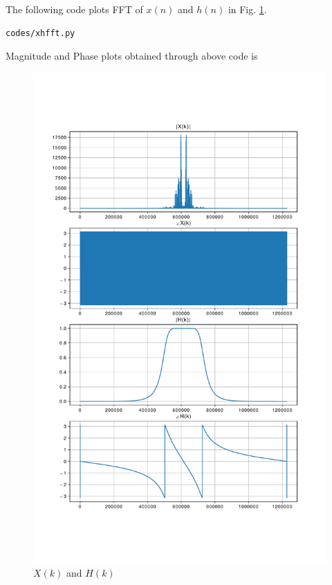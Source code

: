 \documentclass[journal,12pt,twocolumn]{IEEEtran}
\renewcommand\thesection{\arabic{section}}
\begin{document}
\begin{enumerate}[label=\thesection.\arabic*
,ref=\thesection.\theenumi]
The following code plots FFT of $x(n)$ and $h(n)$ in Fig. \ref{fig:xhfft}.
\begin{lstlisting}
codes/xhfft.py
\end{lstlisting}
Magnitude and Phase plots obtained through above code is 
\begin{figure}[!ht]
\centering
\includegraphics[width=\columnwidth]{./figs/xhfft}
\caption{$X(k)$ and $H(k)$}
\label{fig:xhfft}
\end{figure}


\end{enumerate}
\end{document}
